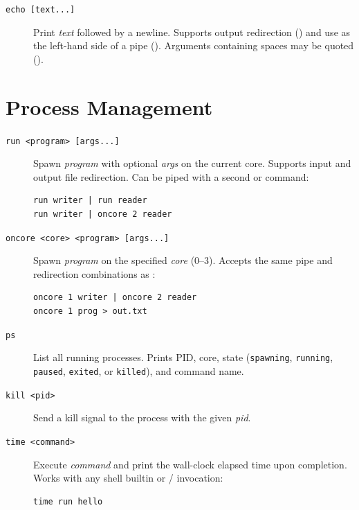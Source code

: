 \begin{description}

\item[\texttt{echo [text...]}]
Print \textit{text} followed by a newline. Supports output redirection
() and use as the left-hand side of a pipe
(). Arguments containing spaces may be quoted
().

\end{description}

\section*{Process Management}

\begin{description}

\item[\texttt{run <program> [args...]}]
Spawn \textit{program} with optional \textit{args} on the current core.
Supports input and output file redirection. Can be piped with a second
 or  command:
\begin{lstlisting}
run writer | run reader
run writer | oncore 2 reader
\end{lstlisting}

\item[\texttt{oncore <core> <program> [args...]}]
Spawn \textit{program} on the specified \textit{core} (0--3). Accepts the
same pipe and redirection combinations as :
\begin{lstlisting}
oncore 1 writer | oncore 2 reader
oncore 1 prog > out.txt
\end{lstlisting}

\item[\texttt{ps}]
List all running processes. Prints PID, core, state (\texttt{spawning},
\texttt{running}, \texttt{paused}, \texttt{exited}, or \texttt{killed}),
and command name.

\item[\texttt{kill <pid>}]
Send a kill signal to the process with the given \textit{pid}.

\item[\texttt{time <command>}]
Execute \textit{command} and print the wall-clock elapsed time upon
completion. Works with any shell builtin or / invocation:
\begin{lstlisting}
time run hello
\end{lstlisting}

\end{description}

